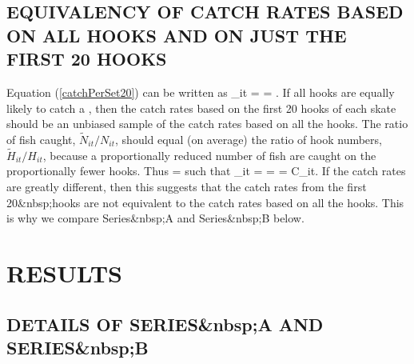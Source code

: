 \subsection{EQUIVALENCY OF CATCH RATES BASED ON ALL HOOKS AND ON JUST THE FIRST 20 HOOKS}

Equation (\ref{catchPerSet20}) can be written as 
\eb
{}_{it} =  =   .
\label{tildeCatchPerSet}
\ee
If all hooks are equally likely to catch a \spName, then the catch rates based
on the first 20 hooks of each skate should be an unbiased sample of the catch
rates based on all the hooks.
%
%
The ratio of fish caught, $\tilde{N}_{it} / N_{it}$, should equal (on average)
the ratio of hook numbers, $\tilde{H}_{it} / H_{it}$, because a proportionally
reduced number of fish are caught on the proportionally fewer hooks. Thus
\eb
{} = 
\ee
such that
\eb
{}_{it} =   =  = C_{it}.
\ee
If the catch rates are greatly different, then this suggests that the catch
rates from the first 20&nbsp;hooks are not equivalent to the catch rates based on all
the hooks. This is why we compare Series&nbsp;A and Series&nbsp;B below.

\section{RESULTS}\label{sec:combine}

\subsection{DETAILS OF SERIES&nbsp;A AND SERIES&nbsp;B}

